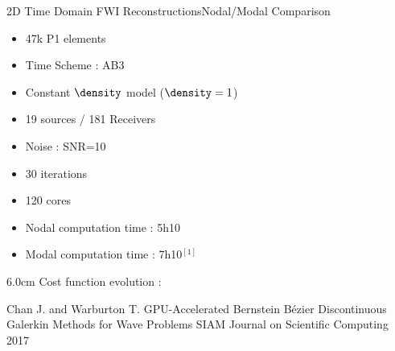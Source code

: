 \begin{frame}{2D Time Domain FWI Reconstructions}{Nodal/Modal Comparison}

  \begin{multicols}{2}
    \begin{itemize}
    \item 47k P1 elements
    \item Time Scheme : AB3
    \item Constant $\density$ model ($\density=1$)
    \item 19 sources / 181 Receivers
    \item Noise : SNR=10
    \item 30 iterations
    \item 120 cores
    \item Nodal computation time : 5h10
    \item Modal computation time : 7h10$^{[1]}$
    \end{itemize}
    \columnbreak

    \setlength{\plotwidth} {6.0cm}
    \setlength{\plotheight}{5cm}
    Cost function evolution :
   \begin{figure}
      \end{figure}
  \end{multicols}

  \vfill
  \tiny
  \begin{thebibliography}{1}
   Chan J. and Warburton T.
    \newblock GPU-Accelerated Bernstein Bézier Discontinuous Galerkin Methods for Wave Problems
    \newblock SIAM Journal on Scientific Computing 2017
  \end{thebibliography}
\end{frame}





